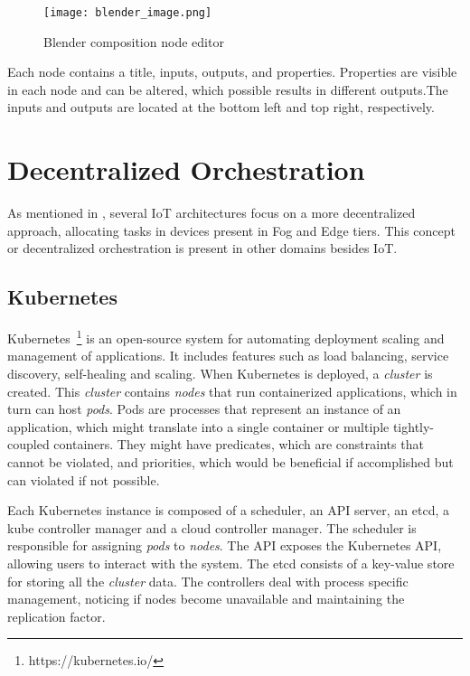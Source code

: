 \begin{figure}[!ht]
\centering
\texttt{[image: blender\_image.png]}
\caption[Blender composition node editor]{Blender composition node editor~\cite{blender_image}}
\label{fig:blender}
\end{figure}

Each node contains a title, inputs, outputs, and properties. Properties are visible in each node and can be altered, which possible results in different outputs.The inputs and outputs are located at the bottom left and top right, respectively. 

\section{Decentralized Orchestration}\label{sec:background_decentralized_orchestration}

As mentioned in , several IoT architectures focus on a more decentralized approach, allocating tasks in devices present in Fog and Edge tiers. This concept or decentralized orchestration is present in other domains besides IoT.

\subsection{Kubernetes}\label{sec:kubernetes}

Kubernetes~\footnote{https://kubernetes.io/} is an open-source system for automating deployment scaling and management of applications. It includes features such as load balancing, service discovery, self-healing and scaling. When Kubernetes is deployed, a \textit{cluster} is created. This \textit{cluster} contains \textit{nodes} that run containerized applications, which in turn can host \textit{pods}. Pods are processes that represent an instance of an application, which might translate into a single container or multiple tightly-coupled containers. They might have predicates, which are constraints that cannot be violated, and priorities, which would be beneficial if accomplished but can violated if not possible.

Each Kubernetes instance is composed of a scheduler, an API server, an etcd, a kube controller manager and a cloud controller manager. The scheduler is responsible for assigning \textit{pods} to \textit{nodes}. The API exposes the Kubernetes API, allowing users to interact with the system. The etcd consists of a key-value store for storing all the \textit{cluster} data. The controllers deal with process specific management, \ie noticing if nodes become unavailable and maintaining the replication factor.

